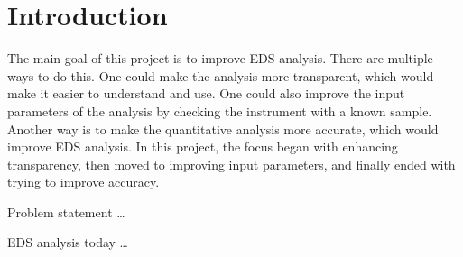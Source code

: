 \chapter{Introduction}
\label{chap:introduction}

%
%
The main goal of this project is to improve EDS analysis. There are multiple ways to do this.
One could make the analysis more transparent, which would make it easier to understand and use.
One could also improve the input parameters of the analysis by checking the instrument with a known sample.
Another way is to make the quantitative analysis more accurate, which would improve EDS analysis.
In this project, the focus began with enhancing transparency, then moved to improving input parameters, and finally ended with trying to improve accuracy.


Problem statement \dots

%
%
EDS analysis today \dots



